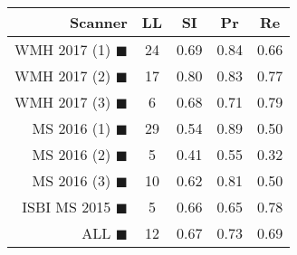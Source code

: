 \begin{tabular}{rcccc}
\toprule
Scanner & LL & SI & Pr & Re \\
\midrule
WMH 2017 (1) {\color[rgb]{ 1.00 0.00 0.00}$\blacksquare$} & 24 & 0.69 & 0.84 & 0.66 \\
WMH 2017 (2) {\color[rgb]{ 1.00 0.50 0.00}$\blacksquare$} & 17 & 0.80 & 0.83 & 0.77 \\
WMH 2017 (3) {\color[rgb]{ 1.00 0.80 0.00}$\blacksquare$} & 6 & 0.68 & 0.71 & 0.79 \\
MS  2016 (1) {\color[rgb]{ 0.20 0.80 0.00}$\blacksquare$} & 29 & 0.54 & 0.89 & 0.50 \\
MS  2016 (2) {\color[rgb]{ 0.00 0.40 1.00}$\blacksquare$} & 5 & 0.41 & 0.55 & 0.32 \\
MS  2016 (3) {\color[rgb]{ 0.60 0.00 1.00}$\blacksquare$} & 10 & 0.62 & 0.81 & 0.50 \\
ISBI MS 2015 {\color[rgb]{ 1.00 0.00 1.00}$\blacksquare$} & 5 & 0.66 & 0.65 & 0.78 \\
\midrule
ALL {\color[rgb]{ 1.00 1.00 1.00}$\blacksquare$} & 12 & 0.67 & 0.73 & 0.69 \\
\bottomrule
\end{tabular}